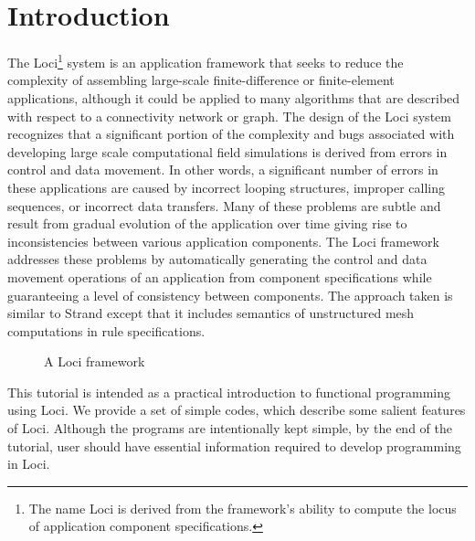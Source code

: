 \chapter {Introduction}
The Loci\footnote{\scriptsize The name Loci is derived from the
  framework's ability to compute the locus of application component
  specifications.} system is an application framework that seeks to
reduce the complexity of assembling large-scale finite-difference or
finite-element applications, although it could be applied to many
algorithms that are described with respect to a connectivity network or
graph.  The design of the Loci system recognizes that a significant
portion of the complexity and bugs associated with developing large
scale computational field simulations is derived from errors in
control and data movement.  In other words, a significant number of
errors in these applications are caused by incorrect looping
structures, improper calling sequences, or incorrect data transfers.
Many of these problems are subtle and result from gradual evolution of
the application over time giving rise to inconsistencies between
various application components.  The Loci framework addresses these
problems by automatically generating the control and data movement
operations of an application from component specifications while
guaranteeing a level of consistency between components.  The approach
taken is similar to Strand \cite{Foster.90} except that it includes
semantics of unstructured mesh computations in rule specifications.
%
\begin{figure}[h]
\vspace{1.5in}\caption {  A Loci framework }
\end{figure}
%
This tutorial is intended as a practical introduction to functional 
programming using Loci. We provide a set of simple codes, which 
describe some salient features of Loci. Although the programs are
intentionally kept simple, by the end of the tutorial, user should
have essential information required to develop programming in Loci. 
